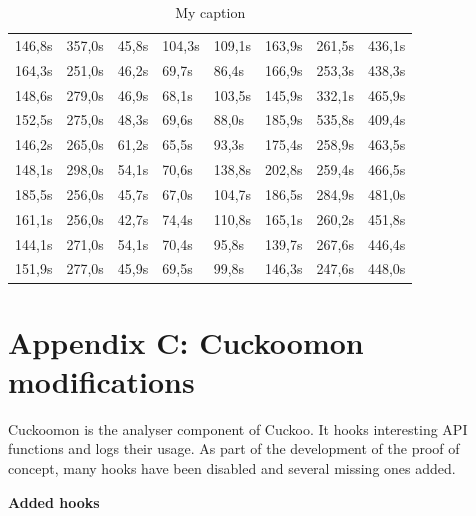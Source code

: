 \documentclass{scrartcl}
\begin{document}
\begin{table}[h]
\begin{tabular}{@{}llllllll@{}}
146,8s  & 357,0s  & 45,8s       & 104,3s      & 109,1s       & 163,9s       & 261,5s       & 436,1s        \\
164,3s  & 251,0s  & 46,2s       & 69,7s       & 86,4s        & 166,9s       & 253,3s       & 438,3s        \\
148,6s  & 279,0s  & 46,9s       & 68,1s       & 103,5s       & 145,9s       & 332,1s       & 465,9s        \\
152,5s  & 275,0s  & 48,3s       & 69,6s       & 88,0s        & 185,9s       & 535,8s       & 409,4s        \\
146,2s  & 265,0s  & 61,2s       & 65,5s       & 93,3s        & 175,4s       & 258,9s       & 463,5s        \\
148,1s  & 298,0s  & 54,1s       & 70,6s       & 138,8s       & 202,8s       & 259,4s       & 466,5s        \\
185,5s  & 256,0s  & 45,7s       & 67,0s       & 104,7s       & 186,5s       & 284,9s       & 481,0s        \\
161,1s  & 256,0s  & 42,7s       & 74,4s       & 110,8s       & 165,1s       & 260,2s       & 451,8s        \\
144,1s  & 271,0s  & 54,1s       & 70,4s       & 95,8s        & 139,7s       & 267,6s       & 446,4s        \\
151,9s  & 277,0s  & 45,9s       & 69,5s       & 99,8s        & 146,3s       & 247,6s       & 448,0s        \\ \bottomrule
\end{tabular}
\caption{My caption}
\label{my-label}
\end{table}

\clearpage

\section*{Appendix C: Cuckoomon modifications}
\label{cuckoomonmods}

Cuckoomon is the analyser component of Cuckoo. It hooks interesting API functions and logs their usage. As part of the development of the proof of concept, many hooks have been disabled and several missing ones added.

\textbf{Added hooks}
\end{document}
